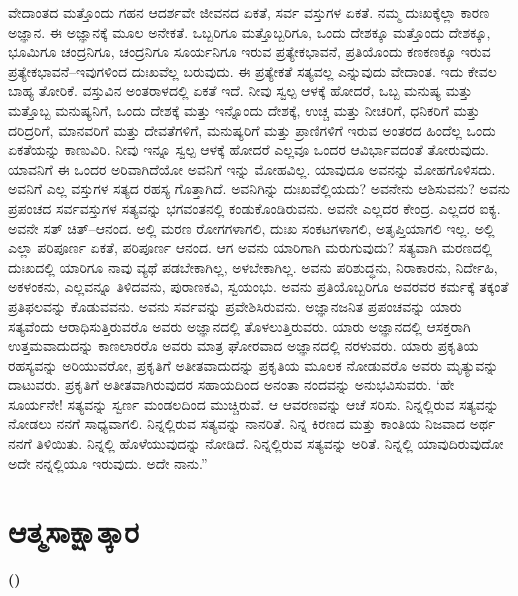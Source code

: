 ವೇದಾಂತದ ಮತ್ತೊಂದು ಗಹನ ಆದರ್ಶವೇ ಜೀವನದ ಏಕತೆ, ಸರ್ವ ವಸ್ತುಗಳ ಏಕತೆ. ನಮ್ಮ ದುಃಖಕ್ಕೆಲ್ಲಾ ಕಾರಣ ಅಜ್ಞಾನ. ಈ ಅಜ್ಞಾನಕ್ಕೆ ಮೂಲ ಅನೇಕತೆ. ಒಬ್ಬರಿಗೂ ಮತ್ತೊಬ್ಬರಿಗೂ, ಒಂದು ದೇಶಕ್ಕೂ ಮತ್ತೊಂದು ದೇಶಕ್ಕೂ, ಭೂಮಿಗೂ ಚಂದ್ರನಿಗೂ, ಚಂದ್ರನಿಗೂ ಸೂರ್ಯನಿಗೂ ಇರುವ ಪ್ರತ್ಯೇಕಭಾವನೆ, ಪ್ರತಿಯೊಂದು ಕಣಕಣಕ್ಕೂ ಇರುವ ಪ್ರತ್ಯೇಕಭಾವನೆ–ಇವುಗಳಿಂದ ದುಃಖವೆಲ್ಲ ಬರುವುದು. ಈ ಪ್ರತ್ಯೇಕತೆ ಸತ್ಯವಲ್ಲ ಎನ್ನುವುದು ವೇದಾಂತ. ಇದು ಕೇವಲ ಬಾಹ್ಯ ತೋರಿಕೆ. ವಸ್ತುವಿನ ಅಂತರಾಳದಲ್ಲಿ ಏಕತೆ ಇದೆ. ನೀವು ಸ್ವಲ್ಪ ಆಳಕ್ಕೆ ಹೋದರೆ, ಒಬ್ಬ ಮನುಷ್ಯ ಮತ್ತು ಮತ್ತೊಬ್ಬ ಮನುಷ್ಯನಿಗೆ, ಒಂದು ದೇಶಕ್ಕೆ ಮತ್ತು ಇನ್ನೊಂದು ದೇಶಕ್ಕೆ, ಉಚ್ಚ ಮತ್ತು ನೀಚರಿಗೆ, ಧನಿಕರಿಗೆ ಮತ್ತು ದರಿದ್ರರಿಗೆ, ಮಾನವರಿಗೆ ಮತ್ತು ದೇವತೆಗಳಿಗೆ, ಮನುಷ್ಯರಿಗೆ ಮತ್ತು ಪ್ರಾಣಿಗಳಿಗೆ ಇರುವ ಅಂತರದ ಹಿಂದೆಲ್ಲ ಒಂದು ಏಕತೆಯನ್ನು ಕಾಣುವಿರಿ. ನೀವು ಇನ್ನೂ ಸ್ವಲ್ಪ ಆಳಕ್ಕೆ ಹೋದರೆ ಎಲ್ಲವೂ ಒಂದರ ಆವಿರ್ಭಾವದಂತೆ ತೋರುವುದು. ಯಾವನಿಗೆ ಈ ಒಂದರ ಅರಿವಾಗಿದೆಯೋ ಅವನಿಗೆ ಇನ್ನು ಮೋಹವಿಲ್ಲ. ಯಾವುದೂ ಅವನನ್ನು ಮೋಹಗೊಳಿಸದು. ಅವನಿಗೆ ಎಲ್ಲ ವಸ್ತುಗಳ ಸತ್ಯದ ರಹಸ್ಯ ಗೊತ್ತಾಗಿದೆ. ಅವನಿಗಿನ್ನು ದುಃಖವೆಲ್ಲಿಯದು? ಅವನೇನು ಆಶಿಸುವನು? ಅವನು ಪ್ರಪಂಚದ ಸರ್ವವಸ್ತುಗಳ ಸತ್ಯವನ್ನು ಭಗವಂತನಲ್ಲಿ ಕಂಡುಕೊಂಡಿರುವನು. ಅವನೇ ಎಲ್ಲದರ ಕೇಂದ್ರ. ಎಲ್ಲದರ ಐಕ್ಯ. ಅವನೇ ಸತ್​ ಚಿತ್​–ಆನಂದ. ಅಲ್ಲಿ ಮರಣ ರೋಗಗಳಾಗಲಿ, ದುಃಖ ಸಂಕಟಗಳಾಗಲಿ, ಅತೃಪ್ತಿಯಾಗಲಿ ಇಲ್ಲ. ಅಲ್ಲಿ ಎಲ್ಲಾ ಪರಿಪೂರ್ಣ ಏಕತೆ, ಪರಿಪೂರ್ಣ ಆನಂದ. ಆಗ ಅವನು ಯಾರಿಗಾಗಿ ಮರುಗುವುದು? ಸತ್ಯವಾಗಿ ಮರಣದಲ್ಲಿ ದುಃಖದಲ್ಲಿ ಯಾರಿಗೂ ನಾವು ವ್ಯಥೆ ಪಡಬೇಕಾಗಿಲ್ಲ, ಅಳಬೇಕಾಗಿಲ್ಲ. ಅವನು ಪರಿಶುದ್ಧನು, ನಿರಾಕಾರನು, ನಿರ್ದೇಹಿ, ಅಕಳಂಕನು, ಎಲ್ಲವನ್ನೂ ತಿಳಿದವನು, ಪುರಾಣಕವಿ, ಸ್ವಯಂಭು. ಅವನು ಪ್ರತಿಯೊಬ್ಬರಿಗೂ ಅವರವರ ಕರ್ಮಕ್ಕೆ ತಕ್ಕಂತೆ ಪ್ರತಿಫಲವನ್ನು ಕೊಡುವವನು. ಅವನು ಸರ್ವವನ್ನು ಪ್ರವೇಶಿಸಿರುವನು. ಅಜ್ಞಾನಜನಿತ ಪ್ರಪಂಚವನ್ನು ಯಾರು ಸತ್ಯವೆಂದು ಆರಾಧಿಸುತ್ತಿರುವರೊ ಅವರು ಅಜ್ಞಾನದಲ್ಲಿ ತೊಳಲುತ್ತಿರುವರು. ಯಾರು ಅಜ್ಞಾನದಲ್ಲಿ ಆಸಕ್ತರಾಗಿ ಉತ್ತಮವಾದುದನ್ನು ಕಾಣಲಾರರೊ ಅವರು ಮಾತ್ರ ಘೋರವಾದ ಅಜ್ಞಾನದಲ್ಲಿ ನರಳುವರು. ಯಾರು ಪ್ರಕೃತಿಯ ರಹಸ್ಯವನ್ನು ಅರಿಯುವರೋ, ಪ್ರಕೃತಿಗೆ ಅತೀತವಾದುದನ್ನು ಪ್ರಕೃತಿಯ ಮೂಲಕ ನೋಡುವರೊ ಅವರು ಮೃತ್ಯುವನ್ನು ದಾಟುವರು. ಪ್ರಕೃತಿಗೆ ಅತೀತವಾಗಿರುವುದರ ಸಹಾಯದಿಂದ ಅನಂತಾ ನಂದವನ್ನು ಅನುಭವಿಸುವರು. ‘ಹೇ ಸೂರ್ಯನೇ! ಸತ್ಯವನ್ನು ಸ್ವರ್ಣ ಮಂಡಲದಿಂದ ಮುಚ್ಚಿರುವೆ. ಆ ಆವರಣವನ್ನು ಆಚೆ ಸರಿಸು. ನಿನ್ನಲ್ಲಿರುವ ಸತ್ಯವನ್ನು ನೋಡಲು ನನಗೆ ಸಾಧ್ಯವಾಗಲಿ. ನಿನ್ನಲ್ಲಿರುವ ಸತ್ಯವನ್ನು ನಾನರಿತೆ. ನಿನ್ನ ಕಿರಣದ ಮತ್ತು ಕಾಂತಿಯ ನಿಜವಾದ ಅರ್ಥ ನನಗೆ ತಿಳಿಯಿತು. ನಿನ್ನಲ್ಲಿ ಹೊಳೆಯುವುದನ್ನು ನೋಡಿದೆ. ನಿನ್ನಲ್ಲಿರುವ ಸತ್ಯವನ್ನು ಅರಿತೆ. ನಿನ್ನಲ್ಲಿ ಯಾವುದಿರುವುದೋ ಅದೇ ನನ್ನಲ್ಲಿಯೂ ಇರುವುದು. ಅದೇ ನಾನು.”

\chapter{ಆತ್ಮಸಾಕ್ಷಾತ್ಕಾರ}%

\centerline{\textbf{(\fontsize{12pt}{14pt}\selectfont{೧೮೯೬ರ ಅಕ್ಟೋಬರ್​ ೨೯ರಂದು ಲಂಡನ್ನಿನಲ್ಲಿ ನೀಡಿದ ಉಪನ್ಯಾಸ})}}

